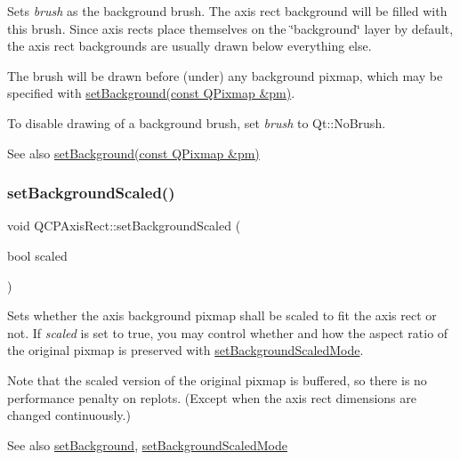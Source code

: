 Sets {\itshape brush} as the background brush. The axis rect background will be filled with this brush. Since axis rects place themselves on the \char`\"{}background\char`\"{} layer by default, the axis rect backgrounds are usually drawn below everything else.

The brush will be drawn before (under) any background pixmap, which may be specified with \hyperlink{classQCPAxisRect_af615ab5e52b8e0a9a0eff415b6559db5}{set\+Background(const Q\+Pixmap \&pm)}.

To disable drawing of a background brush, set {\itshape brush} to Qt\+::\+No\+Brush.

\begin{DoxySeeAlso}{See also}
\hyperlink{classQCPAxisRect_af615ab5e52b8e0a9a0eff415b6559db5}{set\+Background(const Q\+Pixmap \&pm)} 
\end{DoxySeeAlso}
\mbox{\label{classQCPAxisRect_ae6d36c3e0e968ffb991170a018e7b503}} 
\subsubsection{\texorpdfstring{set\+Background\+Scaled()}{setBackgroundScaled()}}
{\footnotesize\ttfamily void Q\+C\+P\+Axis\+Rect\+::set\+Background\+Scaled (\begin{DoxyParamCaption}\item[{bool}]{scaled }\end{DoxyParamCaption})}

Sets whether the axis background pixmap shall be scaled to fit the axis rect or not. If {\itshape scaled} is set to true, you may control whether and how the aspect ratio of the original pixmap is preserved with \hyperlink{classQCPAxisRect_a5ef77ea829c9de7ba248e473f48f7305}{set\+Background\+Scaled\+Mode}.

Note that the scaled version of the original pixmap is buffered, so there is no performance penalty on replots. (Except when the axis rect dimensions are changed continuously.)

\begin{DoxySeeAlso}{See also}
\hyperlink{classQCPAxisRect_af615ab5e52b8e0a9a0eff415b6559db5}{set\+Background}, \hyperlink{classQCPAxisRect_a5ef77ea829c9de7ba248e473f48f7305}{set\+Background\+Scaled\+Mode} 
\end{DoxySeeAlso}
\mbox{\label{classQCPAxisRect_a5ef77ea829c9de7ba248e473f48f7305}} 
